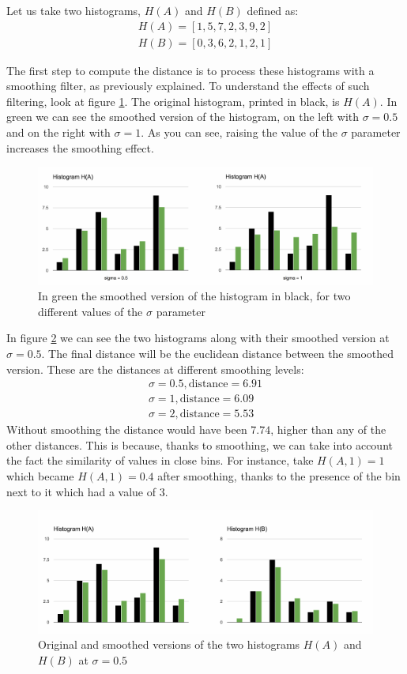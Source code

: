 Let us take two histograms, $H(A)$ and $H(B)$ defined as:
\begin{align}
  H(A) = [1,5,7,2,3,9,2]\\
  H(B) = [0,3,6,2,1,2,1]
\end{align}

The first step to compute the distance is to process these histograms with a smoothing filter, as previously explained. To understand the effects of such filtering, look at figure \ref{fig:sigma_difference}. The original histogram, printed in black, is $H(A)$. In green we can see the smoothed version of the histogram, on the left with $\sigma = 0.5$ and on the right with $\sigma = 1$. As you can see, raising the value of the $\sigma$ parameter increases the smoothing effect.

\begin{figure}[h]
\centering
\includegraphics[width=450]{images/sigma_difference.pdf}
\caption{In green the smoothed version of the histogram in black, for two different values of the $\sigma$ parameter}
\label{fig:sigma_difference}
\end{figure}

In figure \ref{fig:smoothed_a_b} we can see the two histograms along with their smoothed version at $\sigma = 0.5$. The final distance will be the euclidean distance between the smoothed version. These are the distances at different smoothing levels:
\begin{align}
  \sigma = 0.5, \text{distance} = 6.91\nonumber\\
  \sigma = 1, \text{distance} = 6.09\nonumber\\
  \sigma = 2, \text{distance} = 5.53\nonumber
\end{align}
Without smoothing the distance would have been $7.74$, higher than any of the other distances. This is because, thanks to smoothing, we can take into account the fact the similarity of values in close bins. For instance, take $H(A,1) = 1$ which became $H(A,1) = 0.4$ after smoothing, thanks to the presence of the bin next to it which had a value of $3$.

\begin{figure}[h]
\centering
\includegraphics[width=450]{images/smoothed_a_b.pdf}
\caption{Original and smoothed versions of the two histograms $H(A)$ and $H(B)$ at $\sigma = 0.5$}
\label{fig:smoothed_a_b}
\end{figure}

